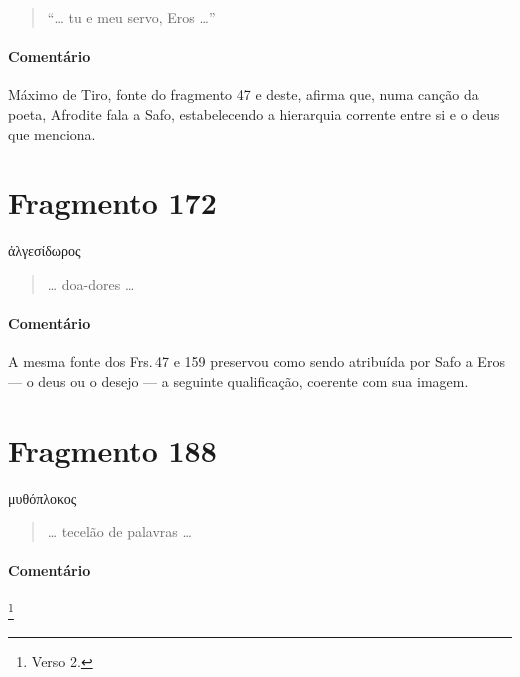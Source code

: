 \begin{verse}
``\ldots{} tu e meu servo, Eros \ldots{}''
\end{verse}

\medskip

{\paragraph{Comentário} Máximo de Tiro, fonte do fragmento 47 e deste, afirma que, numa canção da poeta,
Afrodite fala a Safo, estabelecendo a hierarquia corrente entre si e o deus que
menciona.}

\section{Fragmento 172}

\begin{gkverse}
ἀλγεσίδωρος
\end{gkverse}

\begin{verse}
\ldots{} doa-dores \ldots{} 
\end{verse}

\medskip

\paragraph{Comentário} A mesma fonte dos Frs.\,47 e 159 preservou como sendo atribuída por Safo a Eros --- o deus ou o desejo --- a seguinte qualificação, coerente com sua imagem.

\section{Fragmento 188}

\begin{gkverse}
μυθόπλοκος
\end{gkverse}

\begin{verse}
\ldots{} tecelão de palavras \ldots{}
\end{verse}

\medskip

\paragraph{Comentário} \footnote{Verso 2.}


